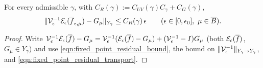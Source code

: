 \begin{lemma}
  \label{lem:c02_conjugated_residual}
  For every admissible $\gamma$, with $C_R(\gamma):=C_{UV}(\gamma)C_\gamma+C_G(\gamma)$,
  \begin{equation}\label{eqn:fixed_point_conjugated_residual_bound}
    \|\mathcal{V}_\epsilon^{-1}\mathcal{E}_\epsilon(\overline{f}_{\epsilon,\mu})-G_\mu\|_{Y_\gamma}\le C_R(\gamma)\,\epsilon\qquad(\epsilon\in[0,\epsilon_0],\ \mu\in\overline{B}).
  \end{equation}
\end{lemma}
\begin{proof}
  Write $\mathcal{V}_\epsilon^{-1}\mathcal{E}_\epsilon(\overline{f})-G_\mu=\mathcal{V}_\epsilon^{-1}(\mathcal{E}_\epsilon(\overline{f})-G_\mu)+(\mathcal{V}_\epsilon^{-1}-I)G_\mu$ (both $\mathcal{E}_\epsilon(\overline{f})$, $G_\mu\in Y_\gamma$)
  and use \eqref{eqn:fixed_point_residual_bound}, the bound on $\|\mathcal{V}_\epsilon^{-1}\|_{Y_\gamma\to Y_\gamma}$, and \eqref{eqn:fixed_point_residual_transport}.
\end{proof}

